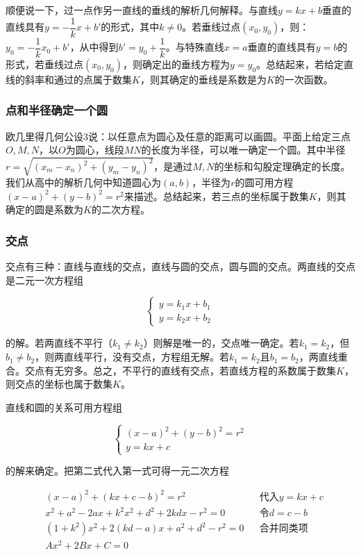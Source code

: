 \documentclass[b5paper]{ctexart}
\begin{document}
顺便说一下，过一点作另一直线的垂线的解析几何解释。与直线$y = kx + b$垂直的直线具有$y = -\dfrac{1}{k} x + b'$的形式，其中$k \ne 0$。若垂线过点$(x_0, y_0)$，则：$y_0 = -\dfrac{1}{k} x_0 + b'$，从中得到$b' = y_0 + \dfrac{1}{k}$。与特殊直线$x = a$垂直的直线具有$y = b$的形式，若垂线过点$(x_0, y_0)$，则确定出的垂线方程为$y = y_0$。总结起来，若给定直线的斜率和通过的点属于数集$K$，则其确定的垂线是系数是为$K$的一次函数。

\subsubsection{点和半径确定一个圆}

欧几里得几何公设3说：以任意点为圆心及任意的距离可以画圆。平面上给定三点$O, M, N$，以$O$为圆心，线段$MN$的长度为半径，可以唯一确定一个圆。其中半径$r = \sqrt{(x_m - x_n)^2 + (y_m - y_n)^2}$，是通过$M, N$的坐标和勾股定理确定的长度。我们从高中的解析几何中知道圆心为$(a, b)$，半径为$r$的圆可用方程$(x - a)^2 + (y - b)^2 = r^2$来描述。总结起来，若三点的坐标属于数集$K$，则其确定的圆是系数为$K$的二次方程。

\subsubsection{交点}
交点有三种：直线与直线的交点，直线与圆的交点，圆与圆的交点。两直线的交点是二元一次方程组

\[
\begin{cases}
y = k_1 x + b_1 \\
y = k_2 x + b_2
\end{cases}
\]

的解。若两直线不平行（$k_1 \ne k_2$）则解是唯一的，交点唯一确定。若$k_1 = k_2$，但$b_1 \ne b_2$，则两直线平行，没有交点，方程组无解。若$k_1 = k_2$且$b_1 = b_2$，两直线重合。交点有无穷多。总之，不平行的直线有交点，若直线方程的系数属于数集$K$，则交点的坐标也属于数集$K$。

直线和圆的关系可用方程组

\[
\begin{cases}
(x - a)^2 + (y - b)^2 = r^2 \\
y = kx + c
\end{cases}
\]

的解来确定。把第二式代入第一式可得一元二次方程

\begin{align*}
& (x - a)^2 + (kx + c - b)^2 = r^2  &&\text{代入}y = kx + c \\
& x^2 + a^2 - 2ax + k^2x^2 + d^2 + 2kdx - r^2 =0 && \text{令}d = c - b \\
& (1 + k^2)x^2 + 2(kd - a)x + a^2 + d^2 - r^2 = 0 && \text{合并同类项} \\
& Ax^2 + 2Bx + C = 0
\end{align*}
\end{document}
